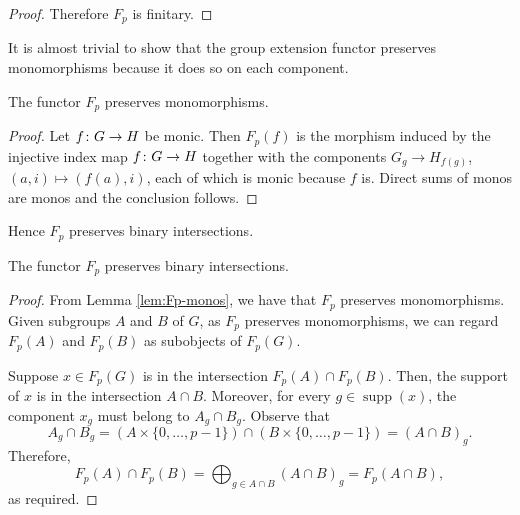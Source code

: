 \documentclass[runningheads]{llncs}
\begin{document}
\begin{proofE}
\begin{proof}
Therefore $F_p$ is finitary.
\end{proof}
It is almost trivial to show that the group extension functor preserves monomorphisms because it does so on each component.
\begin{lemma}
\label{lem:Fp-monos}
The functor $F_p$ preserves monomorphisms.
\end{lemma}
\begin{proof}
Let  $f \colon G \to H$ be monic. Then $F_p(f)$ is the morphism induced by the injective index map $f \colon G \to H$ together with the components $G_g \to H_{f(g)}$, $(a,i) \mapsto (f(a), i)$, each of which is monic because $f$ is. Direct sums of monos are monos and the conclusion follows.
\end{proof}
Hence $F_p$ preserves binary intersections.
\begin{lemma}
The functor $F_p$ preserves binary intersections.
\end{lemma}
\begin{proof}
From Lemma \ref{lem:Fp-monos}, we have that $F_p$ preserves monomorphisms. Given subgroups $A$ and $B$ of $G$, as $F_p$ preserves monomorphisms, we can regard $F_p(A)$ and $F_p(B)$ as subobjects of $F_p(G)$.	

    Suppose $x \in F_p(G)$ is in the intersection $F_p(A) \cap F_p(B)$. Then, the support of $x$ is in the intersection $A\cap B.$ Moreover,  for every $g \in \operatorname{supp}(x)$, the component $x_g$ must belong to $A_g \cap B_g$.  Observe that 
     $$
    A_g \cap B_g = (A \times \{0, \dots, p-1\}) \cap (B \times \{0, \dots, p-1\}) = (A \cap B)_g.
    $$
    Therefore,
    $$
    F_p(A) \cap F_p(B) = \bigoplus_{g \in A \cap B} (A \cap B)_g = F_p(A \cap B),
    $$
    as required.
\end{proof}
\end{proofE}
\end{document}
